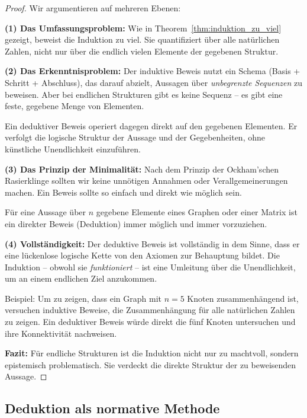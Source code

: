 \documentclass[12pt, a4paper]{article}
\theoremstyle{definition}
\theoremstyle{remark}
\begin{document}
\begin{proof}
Wir argumentieren auf mehreren Ebenen:

\textbf{(1) Das Umfassungsproblem:} Wie in Theorem~\ref{thm:induktion_zu_viel} gezeigt, beweist die Induktion zu viel. Sie quantifiziert über alle natürlichen Zahlen, nicht nur über die endlich vielen Elemente der gegebenen Struktur.

\textbf{(2) Das Erkenntnisproblem:} Der induktive Beweis nutzt ein Schema (Basis + Schritt + Abschluss), das darauf abzielt, Aussagen über \emph{unbegrenzte Sequenzen} zu beweisen. Aber bei endlichen Strukturen gibt es keine Sequenz -- es gibt eine feste, gegebene Menge von Elementen.

Ein deduktiver Beweis operiert dagegen direkt auf den gegebenen Elementen. Er verfolgt die logische Struktur der Aussage und der Gegebenheiten, ohne künstliche Unendlichkeit einzuführen.

\textbf{(3) Das Prinzip der Minimalität:} Nach dem Prinzip der Ockham'schen Rasierklinge sollten wir keine unnötigen Annahmen oder Verallgemeinerungen machen. Ein Beweis sollte so einfach und direkt wie möglich sein.

Für eine Aussage über $n$ gegebene Elemente eines Graphen oder einer Matrix ist ein direkter Beweis (Deduktion) immer möglich und immer vorzuziehen.

\textbf{(4) Vollständigkeit:} Der deduktive Beweis ist vollständig in dem Sinne, dass er eine lückenlose logische Kette von den Axiomen zur Behauptung bildet. Die Induktion -- obwohl sie \emph{funktioniert} -- ist eine Umleitung über die Unendlichkeit, um an einem endlichen Ziel anzukommen.

Beispiel: Um zu zeigen, dass ein Graph mit $n=5$ Knoten zusammenhängend ist, versuchen induktive Beweise, die Zusammenhängung für alle natürlichen Zahlen zu zeigen. Ein deduktiver Beweis würde direkt die fünf Knoten untersuchen und ihre Konnektivität nachweisen.

\textbf{Fazit:} Für endliche Strukturen ist die Induktion nicht nur zu machtvoll, sondern epistemisch problematisch. Sie verdeckt die direkte Struktur der zu beweisenden Aussage.
\end{proof}

\subsection{Deduktion als normative Methode}
\label{subsec:deduktion_normativ}
\end{document}
